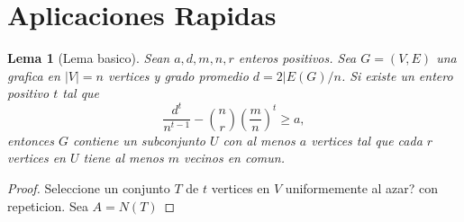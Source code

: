 \documentclass[12pt]{article}
\newtheorem{lema}[section]{Lema}
\begin{document}
\section*{Aplicaciones Rapidas}
\begin{lema}[Lema basico]
    Sean $a, d, m, n, r$ enteros positivos. Sea $G = (V, E)$ una grafica en $\vert V \vert = n$ vertices y grado promedio $d = 2 \vert E(G) /n$. Si existe un entero positivo $t$ tal que 
    $$\frac{d^t}{n^{t-1}} - \binom{n}{r} \left(\frac{m}{n}\right)^t \ge a,$$
    entonces $G$ contiene un subconjunto $U$ con al menos $a$ vertices tal que cada $r$ vertices en $U$ tiene al menos $m$ vecinos en comun.
\end{lema}
\begin{proof}
    Seleccione un conjunto $T$ de $t$ vertices en $V$ uniformemente al azar? con repeticion. Sea $A = N(T)$
\end{proof}
\end{document}
